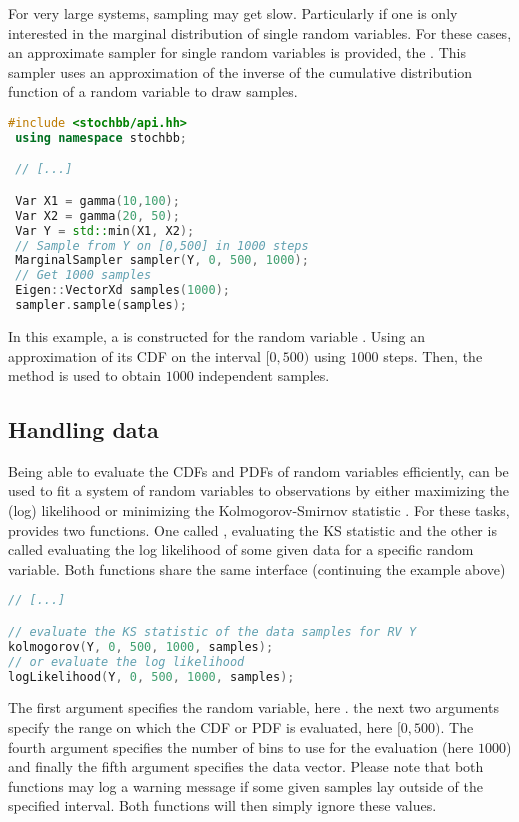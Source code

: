 For very large systems, sampling may get slow. Particularly if one is only interested
in the marginal distribution of single random variables. For these cases, an approximate sampler
for single random variables is provided, the . This sampler uses an
approximation of the inverse of the cumulative distribution function of a random variable
to draw samples.
\begin{lstlisting}[language=C++]
 #include <stochbb/api.hh>
 using namespace stochbb;

 // [...]

 Var X1 = gamma(10,100);
 Var X2 = gamma(20, 50);
 Var Y = std::min(X1, X2);
 // Sample from Y on [0,500] in 1000 steps
 MarginalSampler sampler(Y, 0, 500, 1000);
 // Get 1000 samples
 Eigen::VectorXd samples(1000);
 sampler.sample(samples);
\end{lstlisting}

In this example, a  is constructed for the random variable . Using an
approximation of its CDF on the interval $[0,500)$ using $1000$ steps. Then, the
 method is used to obtain $1000$ independent samples.

\subsection{Handling data}
Being able to evaluate the CDFs and PDFs of random variables efficiently,  can be
used to fit a system of random variables to observations by either maximizing the (log) likelihood
or minimizing the Kolmogorov-Smirnov statistic \cite[KS; e.g.,][]{Marsaglia2003}. For these tasks,
 provides two functions. One called , evaluating the KS statistic
and the other is called  evaluating the log likelihood of some given data for
a specific random variable. Both functions share the same interface (continuing the example above)

\begin{lstlisting}[language=C++]
// [...]

// evaluate the KS statistic of the data samples for RV Y
kolmogorov(Y, 0, 500, 1000, samples);
// or evaluate the log likelihood
logLikelihood(Y, 0, 500, 1000, samples);
\end{lstlisting}

The first argument specifies the random variable, here . the next two arguments specify
the range on which the CDF or PDF is evaluated, here $[0,500)$. The fourth argument specifies the
number of bins to use for the evaluation (here $1000$) and finally the fifth argument specifies
the data vector. Please note that both functions may log a warning message if some given samples
lay outside of the specified interval. Both functions will then simply ignore these values.
